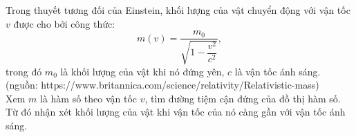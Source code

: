 \begin{ex}
    Trong thuyết tương đối của Einstein, khối lượng của vật chuyển động với vận tốc $v$ được cho bởi công thức:
    $$m(v)=\dfrac{m_0}{\sqrt{1-\dfrac{v^2}{c^2}}},$$
    trong đó $m_0$ là khối lượng của vật khi nó đứng yên, $c$ là vận tốc ánh sáng.\\
    (nguồn: https://www.britannica.com/science/relativity/Relativistic-mass)\\
    Xem $m$ là hàm số theo vận tốc $v$, tìm đường tiệm cận đứng của đồ thị hàm số. Từ đó nhận xét khối lượng của vật khi vận tốc của nó càng gần với vận tốc ánh sáng.
\end{ex}
